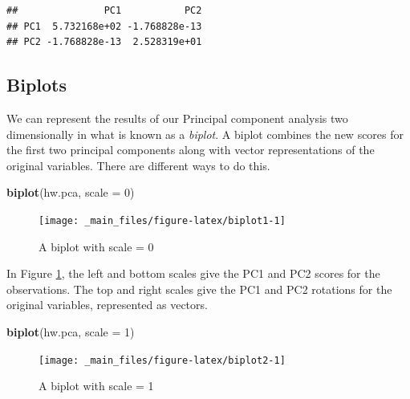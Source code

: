 \documentclass[
]{book}
\newenvironment{Shaded}{\begin{snugshade}}{\end{snugshade}}
\newcommand{\AttributeTok}[1]{\textcolor[rgb]{0.13,0.29,0.53}{#1}}
\newcommand{\DecValTok}[1]{\textcolor[rgb]{0.00,0.00,0.81}{#1}}
\newcommand{\FunctionTok}[1]{\textcolor[rgb]{0.13,0.29,0.53}{\textbf{#1}}}
\newcommand{\NormalTok}[1]{#1}
\theoremstyle{definition}
\theoremstyle{definition}
\theoremstyle{definition}
\theoremstyle{definition}
\theoremstyle{remark}
\begin{document}
\begin{verbatim}
##               PC1           PC2
## PC1  5.732168e+02 -1.768828e-13
## PC2 -1.768828e-13  2.528319e+01
\end{verbatim}

\subsection*{Biplots}\label{biplots}

We can represent the results of our Principal component analysis two dimensionally in what is known as a \emph{biplot}. A biplot combines the new scores for the first two principal components along with vector representations of the original variables. There are different ways to do this.

\begin{Shaded}
\begin{Highlighting}[]
\FunctionTok{biplot}\NormalTok{(hw.pca, }\AttributeTok{scale =} \DecValTok{0}\NormalTok{)}
\end{Highlighting}
\end{Shaded}

\begin{figure}

{\centering \texttt{[image: \_main\_files/figure-latex/biplot1-1]} 

}

\caption{A biplot with scale = 0}\label{fig:biplot1}
\end{figure}

In Figure \ref{fig:biplot1}, the left and bottom scales give the PC1 and PC2 scores for the observations. The top and right scales give the PC1 and PC2 rotations for the original variables, represented as vectors.

\begin{Shaded}
\begin{Highlighting}[]
\FunctionTok{biplot}\NormalTok{(hw.pca, }\AttributeTok{scale =} \DecValTok{1}\NormalTok{)}
\end{Highlighting}
\end{Shaded}

\begin{figure}

{\centering \texttt{[image: \_main\_files/figure-latex/biplot2-1]} 

}

\caption{A biplot with scale = 1}\label{fig:biplot2}
\end{figure}
\end{document}

